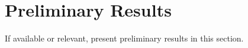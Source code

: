 \chapter{Preliminary Results}
\label{chapter:preliminary-results}

If available or relevant, present preliminary results in this section.
